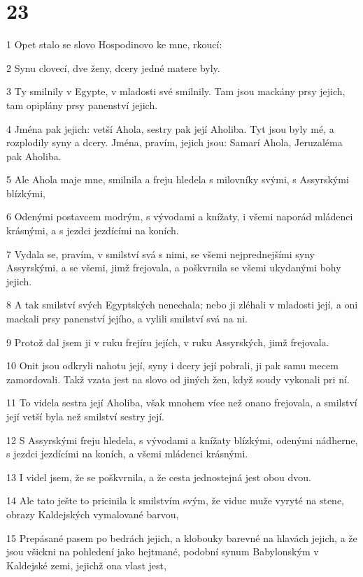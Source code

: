 \chapter{23}

\par 1 Opet stalo se slovo Hospodinovo ke mne, rkoucí:
\par 2 Synu clovecí, dve ženy, dcery jedné matere byly.
\par 3 Ty smilnily v Egypte, v mladosti své smilnily. Tam jsou mackány prsy jejich, tam opiplány prsy panenství jejich.
\par 4 Jména pak jejich: vetší Ahola, sestry pak její Aholiba. Tyt jsou byly mé, a rozplodily syny a dcery. Jména, pravím, jejich jsou: Samarí Ahola, Jeruzaléma pak Aholiba.
\par 5 Ale Ahola maje mne, smilnila a freju hledela s milovníky svými, s Assyrskými blízkými,
\par 6 Odenými postavcem modrým, s vývodami a knížaty, i všemi naporád mládenci krásnými, a s jezdci jezdícími na koních.
\par 7 Vydala se, pravím, v smilství svá s nimi, se všemi nejprednejšími syny Assyrskými, a se všemi, jimž frejovala, a poškvrnila se všemi ukydanými bohy jejich.
\par 8 A tak smilství svých Egyptských nenechala; nebo ji zléhali v mladosti její, a oni mackali prsy panenství jejího, a vylili smilství svá na ni.
\par 9 Protož dal jsem ji v ruku frejíru jejích, v ruku Assyrských, jimž frejovala.
\par 10 Onit jsou odkryli nahotu její, syny i dcery její pobrali, ji pak samu mecem zamordovali. Takž vzata jest na slovo od jiných žen, když soudy vykonali pri ní.
\par 11 To videla sestra její Aholiba, však mnohem více než onano frejovala, a smilství její vetší byla než smilství sestry její.
\par 12 S Assyrskými freju hledela, s vývodami a knížaty blízkými, odenými nádherne, s jezdci jezdícími na koních, a všemi mládenci krásnými.
\par 13 I videl jsem, že se poškvrnila, a že cesta jednostejná jest obou dvou.
\par 14 Ale tato ješte to pricinila k smilstvím svým, že viduc muže vyryté na stene, obrazy Kaldejských vymalované barvou,
\par 15 Prepásané pasem po bedrách jejich, a klobouky barevné na hlavách jejich, a že jsou všickni na pohledení jako hejtmané, podobní synum Babylonským v Kaldejské zemi, jejichž ona vlast jest,
